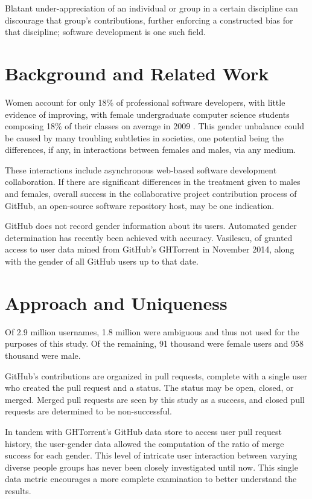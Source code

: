 \documentclass{sigplanconf}
\begin{document}
Blatant under-appreciation of an individual or group in a certain
discipline can discourage that group's contributions, further enforcing a
constructed bias for that discipline; software development is one such
field.

\section{Background and Related Work}

Women account for only 18\% of professional software developers,
\cite{sherdiversity} with little evidence of improving, with female
undergraduate computer science students composing 18\% of
their classes on average in 2009 \cite{womenundergrad}. This gender unbalance could be caused by many troubling subtleties
in societies, one potential being the differences, if any, in interactions
between females and males, via any medium.

These interactions include asynchronous web-based software development
collaboration. If there are significant differences in the treatment given to males
and females, overall success in the collaborative project contribution process
of GitHub, an open-source software repository host, may be one indication.

GitHub does not record gender information about its users. Automated gender
determination has recently been achieved with accuracy. \cite{VasilescuIWC13}
Vasilescu, of \cite{VasilescuIWC13} granted access to user data mined from GitHub's GHTorrent in November 2014,
along with the gender of all GitHub users up to that date.

\section{Approach and Uniqueness}

Of 2.9 million usernames, 1.8 million were ambiguous and thus
not used for the purposes of this study. Of the remaining, 91 thousand were
female users and 958 thousand were male.

GitHub's contributions are organized in pull requests, complete with a single
user who created the pull request and a status. The status may be open, closed,
or merged. Merged pull requests are seen by this study as a success, and closed pull
requests are determined to be non-successful.

In tandem with GHTorrent's GitHub data store to
access user pull request history, the user-gender data allowed the computation of
the ratio of merge success for each gender. This level of intricate user interaction
between varying diverse people groups has never been closely investigated until
now. This single data metric encourages a more complete examination to better
understand the results.
\end{document}
